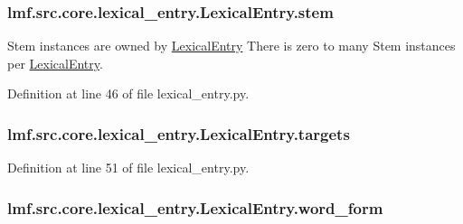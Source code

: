 \hypertarget{classlmf_1_1src_1_1core_1_1lexical__entry_1_1_lexical_entry_a381ed307ce61e5ae137abc94e45be36a}{
\subsubsection[{stem}]{\setlength{\rightskip}{0pt plus 5cm}lmf.\+src.\+core.\+lexical\+\_\+entry.\+Lexical\+Entry.\+stem}}\label{classlmf_1_1src_1_1core_1_1lexical__entry_1_1_lexical_entry_a381ed307ce61e5ae137abc94e45be36a}


Stem instances are owned by \hyperlink{classlmf_1_1src_1_1core_1_1lexical__entry_1_1_lexical_entry}{Lexical\+Entry} There is zero to many Stem instances per \hyperlink{classlmf_1_1src_1_1core_1_1lexical__entry_1_1_lexical_entry}{Lexical\+Entry}. 



Definition at line 46 of file lexical\+\_\+entry.\+py.

\hypertarget{classlmf_1_1src_1_1core_1_1lexical__entry_1_1_lexical_entry_aaf11d999bc91a5cf161fd4ce0ca3319b}{
\subsubsection[{targets}]{\setlength{\rightskip}{0pt plus 5cm}lmf.\+src.\+core.\+lexical\+\_\+entry.\+Lexical\+Entry.\+targets}}\label{classlmf_1_1src_1_1core_1_1lexical__entry_1_1_lexical_entry_aaf11d999bc91a5cf161fd4ce0ca3319b}


Definition at line 51 of file lexical\+\_\+entry.\+py.

\hypertarget{classlmf_1_1src_1_1core_1_1lexical__entry_1_1_lexical_entry_a6418f42441f0d6d25449270298010d03}{
\subsubsection[{word\+\_\+form}]{\setlength{\rightskip}{0pt plus 5cm}lmf.\+src.\+core.\+lexical\+\_\+entry.\+Lexical\+Entry.\+word\+\_\+form}}\label{classlmf_1_1src_1_1core_1_1lexical__entry_1_1_lexical_entry_a6418f42441f0d6d25449270298010d03}


